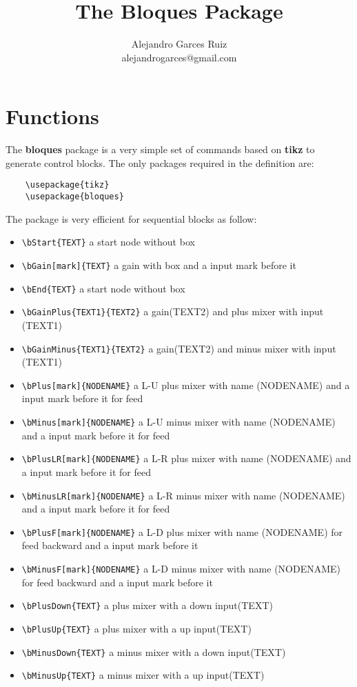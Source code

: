 \documentclass[a4paper,onecolumn]{IEEETran}
\title{The Bloques Package}
\author{Alejandro Garces Ruiz \\ alejandrogarces@gmail.com}
\begin{document}
\maketitle

\section{Functions}


The \textbf{bloques} package is a very simple set of commands based on \textbf{tikz} to generate control blocks.  The only packages required in the definition are:

\begin{verbatim}
	\usepackage{tikz}
	\usepackage{bloques}
\end{verbatim}

The package is very efficient for sequential blocks as follow:

\begin{itemize}
\item \verb|\bStart{TEXT}| a start node without box
\item \verb|\bGain[mark]{TEXT}| a gain with box and a input mark before it
\item \verb|\bEnd{TEXT}| a start node without box
\item \verb|\bGainPlus{TEXT1}{TEXT2}| a gain(TEXT2) and plus mixer with input (TEXT1)
\item \verb|\bGainMinus{TEXT1}{TEXT2}| a gain(TEXT2) and minus mixer with input (TEXT1)
\item \verb|\bPlus[mark]{NODENAME}| a L-U plus mixer with name (NODENAME) and a input mark before it for feed
\item \verb|\bMinus[mark]{NODENAME}| a L-U minus mixer with name (NODENAME) and a input mark before it for feed
\item \verb|\bPlusLR[mark]{NODENAME}| a L-R plus mixer with name (NODENAME) and a input mark before it for feed
\item \verb|\bMinusLR[mark]{NODENAME}| a L-R minus mixer with name (NODENAME) and a input mark before it for feed
\item \verb|\bPlusF[mark]{NODENAME}| a L-D plus mixer with name (NODENAME)  for feed backward and a input mark before it
\item \verb|\bMinusF[mark]{NODENAME}| a L-D minus mixer with name (NODENAME)  for feed backward and a input mark before it
\item \verb|\bPlusDown{TEXT}| a plus mixer with a down input(TEXT)
\item \verb|\bPlusUp{TEXT}|   a plus mixer with a up input(TEXT)
\item \verb|\bMinusDown{TEXT}| a minus mixer with a down input(TEXT)
\item \verb|\bMinusUp{TEXT}| a minus mixer with a up input(TEXT)
\end{itemize}
\end{document}
